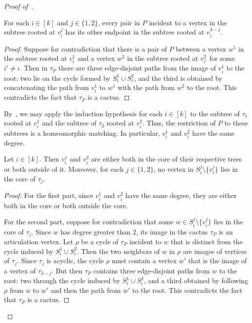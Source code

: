 \begin{proof}[Proof of~]
    \begin{claim}\label{claim:allows-induction}
        For each $i\in[k]$ and $j\in\{1,2\}$, every pair in $P$ incident to a vertex
        in the subtree rooted at $v_i^j$ has its other endpoint in the subtree
        rooted at $v_i^{3-j}$.
    \end{claim}

    \begin{proof}
        Suppose for contradiction that there is a pair of $P$ between a vertex $w^1$
        in the subtree rooted at $v_i^1$ and a vertex $w^2$ in the subtree rooted at
        $v_{i'}^{2}$ for some $i'\neq i$.
        Then in $\tau_P$ there are three edge-disjoint paths from the image of
        $v_i^1$ to the root: two lie on the cycle formed by
        $S_i^1\cup S_i^2$, and the third is obtained by concatenating the path from
        $v_i^1$ to $w^1$ with the path from $w^2$
        to the root. This contradicts the fact that $\tau_P$ is a cactus.
    \end{proof}

    By~, we may apply the induction hypothesis for each
    $i\in[k]$ to the subtree of $\tau_1$ rooted at $v_i^1$ and the subtree of $\tau_2$
    rooted at $v_i^2$. Thus, the restriction of $P$ to these subtrees is a
    homeomorphic matching. In particular, $v_i^1$ and $v_i^2$ have the same degree.


    \begin{claim}\label{claim:both-core}
        Let $i\in[k]$. Then $v_i^1$ and $v_i^2$ are either both in the core of their
        respective trees or both outside of it. Moreover, for each $j\in\{1,2\}$, no
        vertex in $S_i^j\setminus\{v_i^j\}$ lies in the core of $\tau_j$.
    \end{claim}

    \begin{proof}
        For the first part, since $v_i^1$ and $v_i^2$ have the same degree, they are
        either both in the core or both outside the core.

        For the second part, suppose for contradiction that some
        $w\in S_i^j\setminus\{v_i^j\}$ lies in the core of $\tau_j$. Since $w$ has
        degree greater than $2$, its image in the cactus $\tau_P$ is an articulation
        vertex. Let $\rho$ be a cycle of $\tau_P$ incident to $w$ that is distinct
        from the cycle induced by $S_i^1\cup S_i^2$. Then the two neighbors of $w$ in
        $\rho$ are images of vertices of $\tau_j$. Since $\tau_j$ is acyclic, the
        cycle $\rho$ must contain a vertex $w'$ that is the image of a vertex of
        $\tau_{3-j}$. But then $\tau_P$ contains three edge-disjoint paths from $w$
        to the root: two through the cycle induced by $S_i^1\cup S_i^2$, and a third
        obtained by following $\rho$ from $w$ to $w'$ and then the path from $w'$ to
        the root. This contradicts the fact that $\tau_P$ is a cactus.      
    \end{proof}


\end{proof}
